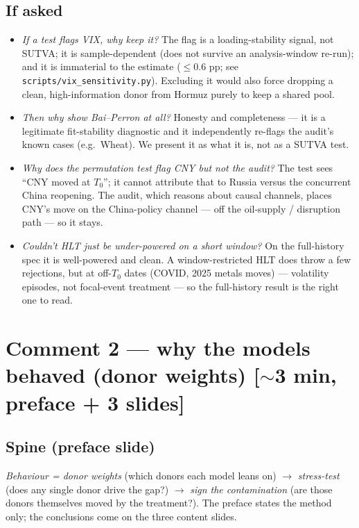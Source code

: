 \documentclass[11pt,a4paper]{article}
\newcommand{\timetag}[1]{\hfill\textcolor{muted}{\small[#1]}}
\begin{document}
\subsection{If asked}
\begin{itemize}
  \item \textit{If a test flags VIX, why keep it?} The flag is a loading-stability signal, not SUTVA;
    it is sample-dependent (does not survive an analysis-window re-run); and it is immaterial to the
    estimate ($\leq 0.6$ pp; see \texttt{scripts/vix\_sensitivity.py}). Excluding it would also force
    dropping a clean, high-information donor from Hormuz purely to keep a shared pool.
  \item \textit{Then why show Bai--Perron at all?} Honesty and completeness --- it is a legitimate
    fit-stability diagnostic and it independently re-flags the audit's known cases (e.g.\ Wheat). We
    present it as what it is, not as a SUTVA test.
  \item \textit{Why does the permutation test flag CNY but not the audit?} The test sees ``CNY moved at
    $T_0$''; it cannot attribute that to Russia versus the concurrent China reopening. The audit, which
    reasons about causal channels, places CNY's move on the China-policy channel --- off the oil-supply /
    disruption path --- so it stays.
  \item \textit{Couldn't HLT just be under-powered on a short window?} On the full-history spec it is
    well-powered and clean. A window-restricted HLT does throw a few rejections, but at off-$T_0$ dates
    (COVID, 2025 metals moves) --- volatility episodes, not focal-event treatment --- so the full-history
    result is the right one to read.
\end{itemize}

\section{Comment 2 --- why the models behaved (donor weights) \timetag{$\sim$3 min, preface + 3 slides}}

\subsection{Spine (preface slide)}
\emph{Behaviour = donor weights} (which donors each model leans on) $\to$ \emph{stress-test} (does any
single donor drive the gap?) $\to$ \emph{sign the contamination} (are those donors themselves moved by
the treatment?). The preface states the method only; the conclusions come on the three content slides.
\end{document}
